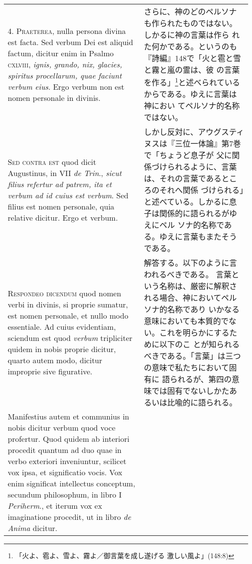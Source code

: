\documentclass[10pt]{jsarticle} %
\begin{document}
\begin{longtable}{p{21em}p{21em}}
\\




4. {\scshape Praeterea}, nulla persona divina est facta. Sed verbum Dei est aliquid
 factum, dicitur enim in Psalmo {\scshape cxlviii}, {\itshape ignis, grando, nix, glacies,
 spiritus procellarum, quae faciunt verbum eius}. Ergo verbum non est
 nomen personale in divinis.

&

さらに、神のどのペルソナも作られたものではない。しかるに神の言葉は作ら
 れた何かである。というのも『詩編』148で「火と雹と雪と霧と嵐の霊は、彼
 の言葉を作る」\footnote{「火よ、雹よ、雪よ、霧よ／御言葉を成し遂げる
 激しい風よ」(148:8)}と述べられているからである。ゆえに言葉は神におい
 てペルソナ的名称ではない。


\\




{\scshape Sed contra est} quod dicit Augustinus, in VII {\itshape de Trin}., {\itshape sicut filius
 refertur ad patrem, ita et verbum ad id cuius est verbum}. Sed filius
 est nomen personale, quia relative dicitur. Ergo et verbum.

&

しかし反対に、アウグスティヌスは『三位一体論』第7巻で「ちょうど息子が
 父に関係づけられるように、言葉は、それの言葉であるところのそれへ関係
 づけられる」と述べている。しかるに息子は関係的に語られるがゆえにペル
 ソナ的名称である。ゆえに言葉もまたそうである。

\\




{\scshape Respondeo dicendum} quod nomen verbi in divinis, si proprie sumatur,
 est nomen personale, et nullo modo essentiale. Ad cuius evidentiam,
 sciendum est quod {\itshape verbum} tripliciter quidem in nobis proprie dicitur,
 quarto autem modo, dicitur improprie sive figurative. 

&

解答する。以下のように言われるべきである。
言葉という名称は、厳密に解釈される場合、神においてペルソナ的名称であり
 いかなる意味においても本質的でない。これを明らかにするために以下のこ
 とが知られるべきである。「言葉」は三つの意味で私たちにおいて固有に
 語られるが、第四の意味では固有でないしかたあるいは比喩的に語られる。


\\


Manifestius
 autem et communius in nobis dicitur verbum quod voce profertur. 
Quod
 quidem ab interiori procedit quantum ad duo quae in verbo exteriori
 inveniuntur, scilicet vox ipsa, et significatio vocis. Vox enim
 significat intellectus conceptum, secundum philosophum, in libro I
 {\itshape Periherm}., et iterum vox ex imaginatione procedit, ut in libro {\itshape de
 Anima} dicitur. 


\end{longtable}
\end{document}
